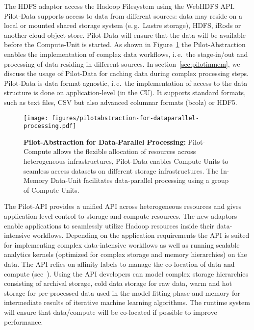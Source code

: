\documentclass{sig-alternate}
\newcommand{\pilot}{Pilot\xspace}
\newcommand{\pilotdata}{Pilot-Data\xspace}
\newcommand{\computeunit}{Compute-Unit\xspace}
\newcommand{\computeunits}{Compute-Units\xspace}
\newcommand{\dataunit}{Data-Unit\xspace}
\newcommand{\cu}{CU\xspace}
\begin{document}
The HDFS adaptor access the Hadoop Filesystem using the WebHDFS API. \pilotdata
supports access to data from different sources: data may reside on a local or
mounted shared storage system (e.\,g.\ Lustre storage), HDFS, iRods or another
cloud object store. \pilotdata will ensure that the data will be available
before the \computeunit is started. As shown in
Figure~\ref{fig:figures_pilotabstraction-for-dataparallel-processing} the
\pilot-Abstraction enables the implementation of complex data workflows,
i.\,e.\ the stage-in/out and processing of data residing in different sources.
In section~\ref{sec:pilotinmem}, we discuss the usage of \pilotdata for caching
data during complex processing steps. \pilotdata is data format agnostic,
i.\,e.\ the implementation of access to the data structure is done on
application-level (in the \cu). It supports standard formats, such as text
files, CSV but also advanced columnar formats (bcolz) or HDF5.



\begin{figure}[t]
    \centering
\texttt{[image: figures/pilotabstraction-for-dataparallel-processing.pdf]}
    \caption{\textbf{Pilot-Abstraction for Data-Parallel Processing:} 
    Pilot-Compute allows the flexible allocation of resources across 
    heterogeneous infrastructures, Pilot-Data enables Compute Units to seamless 
    access datasets on different storage infrastructures. The 
    In-Memory \dataunit facilitates data-parallel processing using a group of 
    \computeunits.}
    \label{fig:figures_pilotabstraction-for-dataparallel-processing}
\end{figure}


The \pilot-API provides a unified API across heterogeneous resources and gives
application-level control to storage and compute resources. The new adaptors
enable applications to seamlessly utilize Hadoop resources inside their
data-intensive workflows. Depending on the application requirements the API is
suited for implementing complex data-intensive workflows as well as running
scalable analytics kernels (optimized for complex storage and memory
hierarchies) on the data. The API relies on affinity labels to manage the
co-location of data and compute (see~\cite{pilotdata}). Using the API
developers can model complex storage hierarchies consisting of archival
storage, cold data storage for raw data, warm and hot storage for pre-processed
data used in the model fitting phase and memory for intermediate results of
iterative machine learning algorithms. The runtime system will ensure that
data/compute will be co-located if possible to improve performance.
\end{document}
